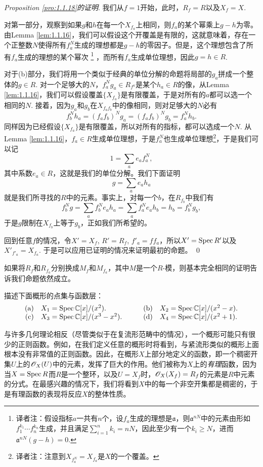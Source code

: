 \noindent\textit{Proposition \ref{pro:1.1.18}的证明}. 我们从$f=1$开始，此时，$R_f=R$以及$X_f=X$.

对第一部分，观察到如果$g$和$h$在每一个$X_{f_a}$上相同，则$f_a$的某个幂乘上$g-h$为零。由Lemma \ref{lem:1.1.16}，我们可以假设这个开覆盖是有限的，这就意味着，存在一个正整数$N$使得所有$f_a^N$生成的理想都是$g-h$的零因子。但是，这个理想包含了所有$f_a$生成的理想的某个幂次
\footnote{译者注：假设指标$a$一共有$n$个，设$f_a$生成的理想是$\mathfrak{a}$，则$\mathfrak{a}^{nN}$中的元素由形如$f_1^{k_1}\cdots f_n^{k_n}$生成，并且满足$\sum_{i=1}^n k_i=nN$，因此至少有一个$k_i\geq N$，进而$\mathfrak{a}^{nN}(g-h)=0$.}
，而所有$f_a$生成单位理想，因此$g=h\in R$.

对于(b)部分，我们将用一个类似于经典的单位分解的命题将局部的$g_a$拼成一个整体的$g\in R$. 对一个足够大的$N$，$f_a^Ng_a\in R_{f^a}$是某个$h_a\in R$的像，从Lemma \ref{lem:1.1.16}，我们可以假设覆盖$\{X_{f_a}\}$是有限覆盖，于是对所有的$a$都可以选一个相同的$N$. 接着，因为$g_a$和$g_b$在$X_{f_af_b}$中的像相同，则对足够大的$N$必有
\[
	f_b^Nh_a=(f_af_b)^Ng_a=(f_af_b)^Ng_b=f_a^Nh_b.
\]
同样因为已经假设$\{X_{f_a}\}$是有限覆盖，所以对所有的指标，都可以选成一个$N$. 从Lemma \ref{lem:1.1.16}，$f_a\in R$生成单位理想，于是$f_a^N$也生成单位理想\footnote{译者注：注意到$X_{f_a^N}=X_{f_a}$是$X$的一个覆盖。}，于是我们可以记
\[
	1=\sum_a e_a f_a^N,
\]
其中系数$e_a\in R$，这就是我们的单位分解。我们下面证明
\[
	g=\sum_a e_ah_a
\]
就是我们所寻找的$R$中的元素。事实上，对每一个$b$，在$R_{f_b}$中我们有
\[
	f_b^N g =\sum_a f_b^N e_ah_a=\sum_a f_a^N e_a h_b=h_b=f_b^N g_b,
\]
于是$g$限制在$X_{f_b}$上等于$g_b$，正如我们所希望的。

回到任意$f$的情况，令$X'=X_f$, $R'=R_f$, $f'_a=ff_a$，所以$X'=\operatorname{Spec} R'$以及$X'_{f'_a}=X_{f_a}$. 于是可以应用已证明的情况来证明最初的命题。
\qed

如果将$R_f$和$R_{f_a}$分别换成$M_f$和$M_{f_a}$，其中$M$是一个$R$\hyp 模，则基本完全相同的证明告诉我们命题依然成立。

\begin{exe}
描述下面概形的点集与函数层：
\[
\begin{array}{rlcrl}
\text{(a)} & X_1=\operatorname{Spec} \mathbb{C}[x]/(x^2).    &\quad & \text{(b)} & X_2=\operatorname{Spec} \mathbb{C}[x]/(x^2-x).\\
\text{(c)} & X_3=\operatorname{Spec} \mathbb{C}[x]/(x^3-x^2).&\quad & \text{(d)} & X_4=\operatorname{Spec} \mathbb{C}[x]/(x^2+1).
\end{array}
\]
\end{exe}

与许多几何理论相反（尽管类似于在复流形范畴中的情况），一个概形可能只有很少的正则函数。例如，在我们定义任意的概形时将看到，与紧流形类似的概形上面根本没有非常值的正则函数。因此，在概形$X$上部分地定义的函数，即一个稠密开集$U$上的$\mathscr{O}_X(U)$中的元素，发挥了巨大的作用。他们被称为$X$上的\textit{有理}函数，因为当$X=\operatorname{Spec} R$而$R$是一个整环，以及$U=X_f$时，$\mathscr{O}_X(X_f)=R_f$的元素是$R$中元素的分式。在最感兴趣的情况下，我们将看到$X$中的每一个非空开集都是稠密的，于是有理函数的表现将反应$X$的整体性质。

